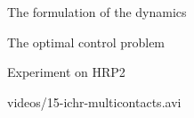\begin{frame}{The formulation of the dynamics}
\begin{itemize}
\end{itemize}

\end{frame}


\begin{frame}{The optimal control problem}

\begin{center}
  \hspace*{-1cm}
  \scalebox{0.7}{}
\end{center}
\end{frame}


\begin{frame}{Experiment on HRP2}
  \begin{center}
    {videos/15-ichr-multicontacts.avi}
  \end{center}
\end{frame}




